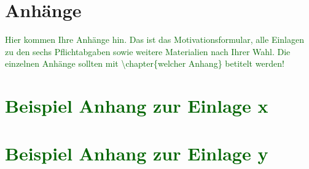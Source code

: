 \documentclass[pdftex,12pt,twoside,footsepline,headsepline,a4paper,final]{scrreprt}
\begin{document}



\appendix 

\chapter*{Anh\"{a}nge}


\textcolor{darkgreen}{Hier kommen Ihre Anh\"{a}nge hin. Das ist das Motivationsformular, alle Einlagen zu den sechs Pflichtabgaben sowie weitere Materialien nach Ihrer Wahl. Die einzelnen Anh\"{a}nge sollten mit \textbackslash chapter\{welcher Anhang\} betitelt werden!}


\chapter{\textcolor{darkgreen}{Beispiel Anhang zur Einlage x}}


\chapter{\textcolor{darkgreen}{Beispiel Anhang zur Einlage y}}
\end{document}

